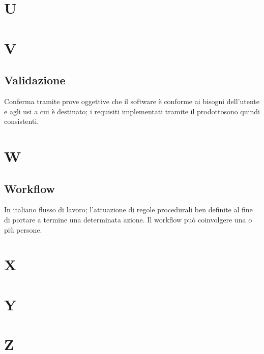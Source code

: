 \clearpage
\section*{U}

\clearpage
\section*{V}

\subsection*{Validazione}
Conferma tramite prove oggettive che il software è conforme ai bisogni dell'utente e agli usi a cui è destinato; i requisiti implementati tramite il prodotto\glosp sono quindi consistenti.

\clearpage
\section*{W}

\subsection*{Workflow}
In italiano flusso di lavoro; l'attuazione di regole procedurali ben definite al fine di portare a termine una determinata azione. Il workflow può coinvolgere una o più persone.


\clearpage
\section*{X}

\clearpage
\section*{Y}

\clearpage
\section*{Z}

